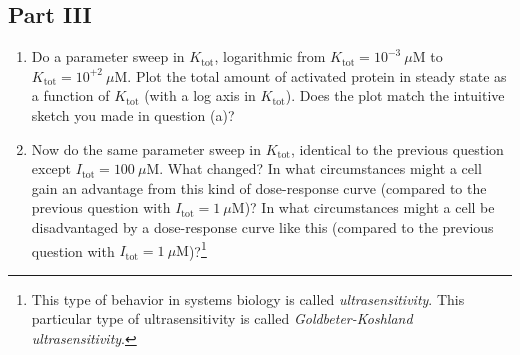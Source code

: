 \documentclass[
  letterpaper,
  DIV=11,
  numbers=noendperiod]{scrartcl}
\providecommand{\tightlist}{%
  \setlength{\itemsep}{0pt}\setlength{\parskip}{0pt}}
\begin{document}
\subsection{Part III}\label{part-iii}

\begin{enumerate}
\def\labelenumi{\alph{enumi}.}
\setcounter{enumi}{4}
\tightlist
\item
  Do a parameter sweep in \(K_\mathrm{tot}\), logarithmic from
  \(K_\mathrm{tot} = 10^{-3}~\mu\mathrm{M}\) to
  \(K_\mathrm{tot} = 10^{+2}~\mu\mathrm{M}\). Plot the total amount of
  activated protein in steady state as a function of \(K_\mathrm{tot}\)
  (with a log axis in \(K_\mathrm{tot}\)). Does the plot match the
  intuitive sketch you made in question (a)?
\item
  Now do the same parameter sweep in \(K_\mathrm{tot}\), identical to
  the previous question except \(I_\mathrm{tot}=100~\mu\mathrm{M}\).
  What changed? In what circumstances might a cell gain an advantage
  from this kind of dose-response curve (compared to the previous
  question with \(I_\mathrm{tot}=1~\mu\mathrm{M}\))? In what
  circumstances might a cell be disadvantaged by a dose-response curve
  like this (compared to the previous question with
  \(I_\mathrm{tot}=1~\mu\mathrm{M}\))?\footnote{This type of behavior in
    systems biology is called \emph{ultrasensitivity}. This particular
    type of ultrasensitivity is called \emph{Goldbeter-Koshland
    ultrasensitivity}.}
\end{enumerate}
\end{document}
